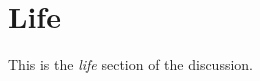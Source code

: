 \section{Life}
\label{life-discussion}

This is the \emph{life} section of the discussion.

\clearpage

